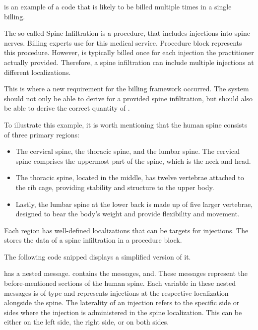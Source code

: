 \cite{hermanns2013bemessung} is an example of a code that is likely to be billed multiple times in a single billing.

The so-called Spine Infiltration is a procedure, that includes injections into spine nerves.
Billing experts use  for this medical service.
Procedure block  represents this procedure.
However,  is typically billed once for each injection the practitioner actually provided.
Therefore, a spine infiltration can include multiple injections at different localizations.

This is where a new requirement for the billing framework occurred.
The system should not only be able to derive  for a provided spine infiltration, but should also be able to derive the correct quantity of .

To illustrate this example, it is worth mentioning that the human spine consists of three primary regions:
\begin{itemize}
    \item The cervical spine, the thoracic spine, and the lumbar spine.
    The cervical spine comprises the uppermost part of the spine, which is the neck and head.
    \item The thoracic spine, located in the middle, has twelve vertebrae attached to the rib cage, providing stability and structure to the upper body.
    \item Lastly, the lumbar spine at the lower back is made up of five larger vertebrae, designed to bear the body's weight and provide flexibility and movement.
\end{itemize}
Each region has well-defined localizations that can be targets for injections.
The \AVS stores the data of a spine infiltration in a procedure block.

The following code snipped displays a simplified version of it.



 has a nested message.
 contains the messages, and.
These messages represent the before-mentioned sections of the human spine.
Each variable in these nested messages is of type and represents injections at the respective localization alongside the spine.
The laterality of an injection refers to the specific side or sides where the injection is administered in the spine localization.
This can be either on the left side, the right side, or on both sides.

